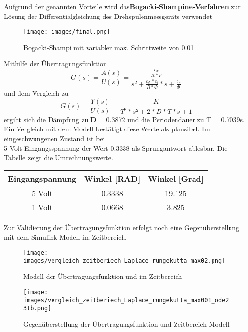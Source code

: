 \documentclass[12pt,a4paper]{scrartcl}	%
\begin{document}
Aufgrund der genannten Vorteile wird das\textbf{Bogacki-Shampine-Verfahren} zur Lösung der Differentialgleichung des Drehspulenmessgeräts verwendet. 
\begin{figure}[htb]
	\centering
	\texttt{[image: images/final.png]}
	\caption{Bogacki-Shampi mit variabler max. Schrittweite von 0.01}
	\label{final}
\end{figure}
Mithilfe der Übertragungsfunktion 
\begin{equation}\label{laplace}
G(s) = \frac{A(s)}{U(s)}= \frac{\frac{c_{\Phi}}{R*\Phi}}{s^{2}+\frac{c_{\Phi}*c_{i}}{R*\Phi}*s+\frac{c_{F}}{\Phi}} 
\end{equation}
und dem Vergleich zu
\begin{equation}\label{laplace}
G(s) = \frac{Y(s)}{U(s)}= \frac{K}{T^{2}*s^{2}+2*D*T*s+1} 
\end{equation}
ergibt sich die Dämpfung zu \textbf{D} = 0.3872 und die Periodendauer zu T = 0.7039s. Ein Vergleich mit dem Modell bestätigt diese Werte als plausibel. Im eingeschwungenen Zustand ist bei \\
5 Volt Eingangsspannung der Wert 0.3338 als Sprungantwort ablesbar. Die Tabelle zeigt die Umrechnungswerte.
\begin{center}
\begin{tabular}{|c|c|c|}
	\hline 
	Eingangspannung & Winkel [RAD] & Winkel [Grad]\\
	\hline 
	
	\hline 
	5 Volt & 0.3338  & 19.125  \\  
	\hline 
	1 Volt & 0.0668  & 3.825  \\
	\hline 

\end{tabular}
\end{center}
Zur Validierung der Übertragungsfunktion erfolgt noch eine Gegenüberstellung mit dem Simulink Modell im Zeitbereich.
\begin{figure}[htb]
	\centering
	\texttt{[image: images/vergleich\_zeitberiech\_Laplace\_rungekutta\_max02.png]}
	\caption{Modell der Übertragungsfunktion und im Zeitbereich}
\end{figure}
\begin{figure}[htb]
	\centering
	\texttt{[image: images/vergleich\_zeitberiech\_Laplace\_rungekutta\_max001\_ode23tb.png]}
	\caption{Gegenüberstellung der Übertragungsfunktion und Zeitbereich Modell}
\end{figure}
\newpage
\end{document}
